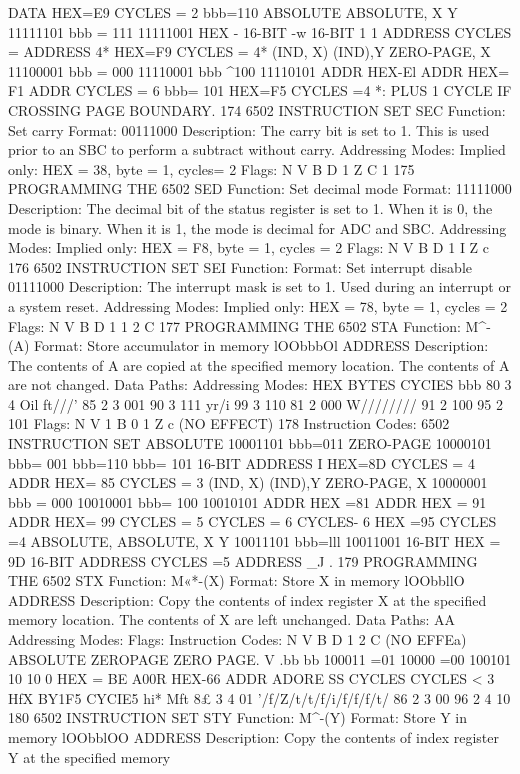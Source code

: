 \documentclass{book}
\begin{document}
DATA
HEX=E9 CYCLES = 2
bbb=110
ABSOLUTE
ABSOLUTE,
X
Y
11111101
bbb = 111
11111001
HEX -
16-BIT
-w
16-BIT
1
1
ADDRESS
CYCLES =
ADDRESS
4*
HEX=F9 CYCLES = 4*
(IND, X)
(IND),Y
ZERO-PAGE, X
11100001
bbb = 000
11110001
bbb ^100
11110101
ADDR
HEX-El
ADDR
HEX= F1
ADDR
CYCLES = 6
bbb= 101 HEX=F5 CYCLES =4
*: PLUS 1 CYCLE IF CROSSING PAGE BOUNDARY.
174
6502 INSTRUCTION SET
SEC
Function:
Set carry
Format: 00111000
Description:
The carry bit is set to 1. This is used prior to an SBC to perform
a subtract without carry.
Addressing Modes:
Implied only:
HEX = 38, byte = 1, cycles= 2
Flags: N V B D 1 Z C
1
175
PROGRAMMING THE 6502
SED
Function:
Set decimal mode
Format:
11111000
Description:
The decimal bit of the status register is set to 1. When it is 0,
the mode is binary. When it is 1, the mode is decimal for ADC and
SBC.
Addressing Modes:
Implied only:
HEX = F8, byte = 1, cycles = 2
Flags: N V B D
1
I Z c
176
6502 INSTRUCTION SET
SEI
Function:
Format:
Set interrupt disable
01111000
Description:
The interrupt mask is set to 1. Used during an interrupt or a system
reset.
Addressing Modes:
Implied only:
HEX = 78, byte = 1, cycles = 2
Flags: N V B D 1
1
2 C
177
PROGRAMMING THE 6502
STA
Function:
M^-(A)
Format:
Store accumulator in memory
lOObbbOl ADDRESS
Description:
The contents of A are copied at the specified memory location.
The contents of A are not changed.
Data Paths:
Addressing Modes:
HEX
BYTES
CYCIES
bbb
80
3
4
Oil
ft///'
85
2
3
001
90
3
111
yr/i
99
3
110
81
2
000
W////////
91
2
100
95
2
101
Flags:
N V
1
B 0 1 Z c
(NO EFFECT)
178
Instruction Codes:
6502 INSTRUCTION SET
ABSOLUTE 10001101
bbb=011
ZERO-PAGE 10000101
bbb= 001
bbb=110
bbb= 101
16-BIT ADDRESS
I
HEX=8D CYCLES = 4
ADDR
HEX= 85 CYCLES = 3
(IND, X)
(IND),Y
ZERO-PAGE, X
10000001
bbb = 000
10010001
bbb= 100
10010101
ADDR
HEX =81
ADDR
HEX = 91
ADDR
HEX= 99 CYCLES = 5
CYCLES = 6
CYCLES- 6
HEX =95 CYCLES =4
ABSOLUTE,
ABSOLUTE,
X
Y
10011101
bbb=lll
10011001
16-BIT
HEX = 9D
16-BIT
ADDRESS
CYCLES =5
ADDRESS
_J .
179
PROGRAMMING THE 6502
STX
Function:
M«*-(X)
Format:
Store X in memory
lOObbllO ADDRESS
Description:
Copy the contents of index register X at the specified memory
location. The contents of X are left unchanged.
Data Paths:
AA
Addressing Modes:
Flags:
Instruction Codes:
N V B D 1 2 C
(NO EFFEa)
ABSOLUTE
ZEROPAGE
ZERO PAGE. V
.bb
bb
100011
=01
10000
=00
100101
10
10
0
HEX = BE
A00R
HEX-66
ADDR
ADORE SS
CYCLES
CYCLES
<
3
HfX
BY1F5
CYCIE5
hi*
Mft
8£
3
4
01
'/f/Z/t/t/f/i/f/f/f/t/
86
2
3
00
96
2
4
10
180
6502 INSTRUCTION SET
STY
Function:
M^-(Y)
Format:
Store Y in memory
lOObblOO ADDRESS
Description:
Copy the contents of index register Y at the specified memory
\end{document}
